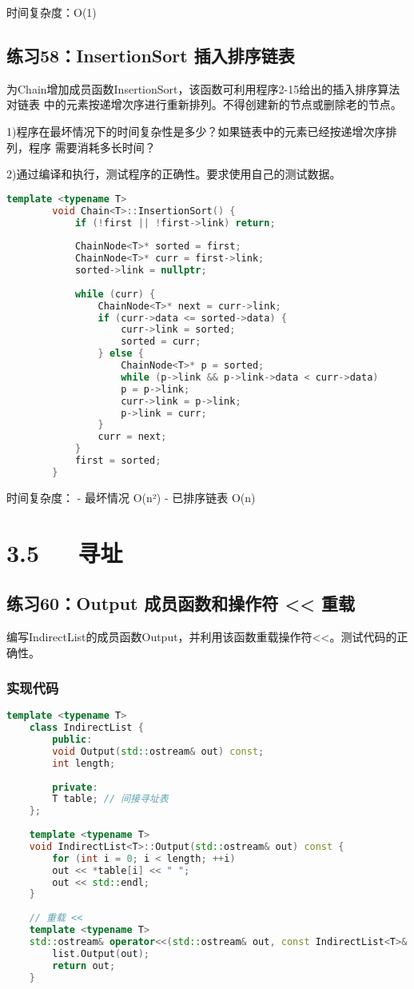 \documentclass[UTF8]{ctexart}
\begin{document}
	 时间复杂度：O(1)
	
	
	
	\subsection*{练习58：InsertionSort 插入排序链表}
	为Chain增加成员函数InsertionSort，该函数可利用程序2-15给出的插入排序算法对链表
	中的元素按递增次序进行重新排列。不得创建新的节点或删除老的节点。
	
	1)程序在最坏情况下的时间复杂性是多少？如果链表中的元素已经按递增次序排列，程序
	需要消耗多长时间？
	
	2)通过编译和执行，测试程序的正确性。要求使用自己的测试数据。
	
	\begin{lstlisting}[language=C++]
		template <typename T>
		void Chain<T>::InsertionSort() {
			if (!first || !first->link) return;
			
			ChainNode<T>* sorted = first;
			ChainNode<T>* curr = first->link;
			sorted->link = nullptr;
			
			while (curr) {
				ChainNode<T>* next = curr->link;
				if (curr->data <= sorted->data) {
					curr->link = sorted;
					sorted = curr;
				} else {
					ChainNode<T>* p = sorted;
					while (p->link && p->link->data < curr->data)
					p = p->link;
					curr->link = p->link;
					p->link = curr;
				}
				curr = next;
			}
			first = sorted;
		}
	\end{lstlisting}
	
	 时间复杂度：
	- 最坏情况 O(n²)
	- 已排序链表 O(n)
	
\section{3.5~~~寻址}

\subsection*{练习60：Output 成员函数和操作符 << 重载}
编写IndirectList的成员函数Output，并利用该函数重载操作符<<。测试代码的正确性。
\subsubsection*{实现代码}

\begin{lstlisting}[language=C++]
	template <typename T>
	class IndirectList {
		public:
		void Output(std::ostream& out) const;
		int length;
		
		private:
		T table; // 间接寻址表
	};
	
	template <typename T>
	void IndirectList<T>::Output(std::ostream& out) const {
		for (int i = 0; i < length; ++i)
		out << *table[i] << " ";
		out << std::endl;
	}
	
	// 重载 <<
	template <typename T>
	std::ostream& operator<<(std::ostream& out, const IndirectList<T>& list) {
		list.Output(out);
		return out;
	}
\end{lstlisting}
\end{document}
